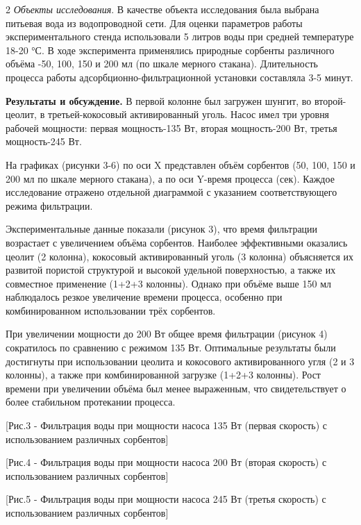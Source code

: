 \begin{multicols}{2}
\emph{Объекты исследования}. В качестве объекта исследования
была выбрана питьевая вода из водопроводной сети. Для оценки параметров
работы экспериментального стенда использовали 5 литров воды при средней
температуре 18-20 °С. В ходе эксперимента применялись природные сорбенты
различного объёма -50, 100, 150 и 200 мл (по шкале мерного стакана).
Длительность процесса работы адсорбционно-фильтрационной установки
составляла 3-5 минут.

{\bfseries Результаты и обсуждение.} В первой колонне был загружен шунгит,
во второй-цеолит, в третьей-кокосовый активированный уголь. Насос имел
три уровня рабочей мощности: первая мощность-135 Вт, вторая мощность-200
Вт, третья мощность-245 Вт.

На графиках (рисунки 3-6) по оси X представлен объём сорбентов (50, 100,
150 и 200 мл по шкале мерного стакана), а по оси Y-время процесса (сек).
Каждое исследование отражено отдельной диаграммой с указанием
соответствующего режима фильтрации.

Экспериментальные данные показали (рисунок 3), что время фильтрации
возрастает с увеличением объёма сорбентов. Наиболее эффективными
оказались цеолит (2 колонна), кокосовый активированный уголь (3 колонна)
объясняется их развитой пористой структурой и высокой удельной
поверхностью, а также их совместное применение (1+2+3 колонны). Однако
при объёме выше 150 мл наблюдалось резкое увеличение времени процесса,
особенно при комбинированном использовании трёх сорбентов.

При увеличении мощности до 200 Вт общее время фильтрации (рисунок 4)
сократилось по сравнению с режимом 135 Вт. Оптимальные результаты были
достигнуты при использовании цеолита и кокосового активированного угля
(2 и 3 колонны), а также при комбинированной загрузке (1+2+3 колонны).
Рост времени при увеличении объёма был менее выраженным, что
свидетельствует о более стабильном протекании процесса.
\end{multicols}

[Рис.3 - Фильтрация воды при мощности насоса 135 Вт (первая
скорость) с использованием различных сорбентов]

[Рис.4 - Фильтрация воды при мощности насоса 200 Вт (вторая
скорость) с использованием различных сорбентов]

[Рис.5 - Фильтрация воды при мощности насоса 245 Вт (третья
скорость) с использованием различных сорбентов]

